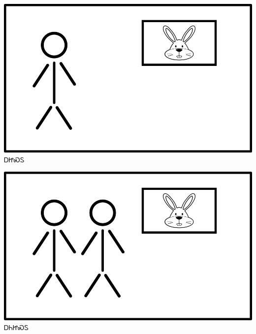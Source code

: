 \documentclass[avery8371]{flashcards}%
\begin{document}
    \begin{flashcard}{
        \includegraphics[width=0.95\columnwidth,height=.51\columnwidth,keepaspectratio]{../artwork/flags/ajisdu-flag}
    }
        \Huge ᎠᏥᏍᏚ
    \end{flashcard}
    \begin{flashcard}{
        \includegraphics[width=0.95\columnwidth,height=.51\columnwidth,keepaspectratio]{../artwork/flags/anijisdu-flag}
    }
        \Huge ᎠᏂᏥᏍᏚ
    \end{flashcard}
\end{document}

